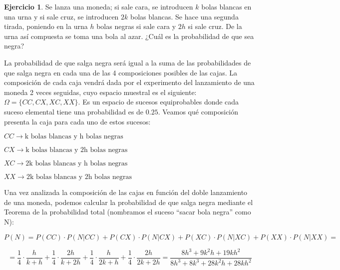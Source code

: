 \documentclass[a4paper, 12pt]{article}
\theoremstyle{definition}
\newtheorem{ej}{Ejercicio}
\begin{document}
\begin{ej}
Se lanza una moneda; si sale cara, se introducen $k$ bolas blancas en una urna y si sale cruz, se
introducen $2k$ bolas blancas. Se hace una segunda tirada, poniendo en la urna $h$ bolas negras
si sale cara y $2h$ si sale cruz. De la urna así compuesta se toma una bola al azar. ¿Cuál es la
probabilidad de que sea negra?


\medskip

La probabilidad de que salga negra será igual a la suma de las probabilidades de que salga negra en cada una de las 4 composiciones posibles de las cajas. La composición de cada caja vendrá dada por el experimento del lanzamiento de una moneda 2 veces seguidas, cuyo espacio muestral es el siguiente: $\Omega = \{CC,CX,XC,XX\}$. Es un espacio de sucesos equiprobables donde cada suceso elemental tiene una probabilidad es de $0.25$. Veamos qué composición presenta la caja para cada uno de estos sucesos:

\begin{center}
    $CC \longrightarrow \text{k bolas blancas y h bolas negras}$
    
    $CX \longrightarrow \text{k bolas blancas y 2h bolas negras}$
    
    $XC \longrightarrow \text{2k bolas blancas y h bolas negras}$
    
    $XX \longrightarrow \text{2k bolas blancas y 2h bolas negras}$
\end{center}

Una vez analizada la composición de las cajas en función del doble lanzamiento de una moneda, podemos calcular la probabilidad de que salga negra mediante el Teorema de la probabilidad total (nombramos el suceso ``sacar bola negra'' como N):

\begin{center}
    $P(N) = P(CC) \cdot P(N|CC) + P(CX) \cdot P(N|CX) + P(XC) \cdot P(N|XC) + P(XX) \cdot P(N|XX) = $
\end{center}

\[
    = \frac{1}{4} \cdot \frac{h}{k+h} + \frac{1}{4} \cdot \frac{2h}{k+2h} + \frac{1}{4} \cdot \frac{h}{2k+h} + \frac{1}{4} \cdot \frac{2h}{2k+2h} = \frac{8h^3+9k^{2}h+19kh^2}{8h^3+8k^3+28k^{2}h+28kh^2}
\]
\end{ej}
\end{document}
